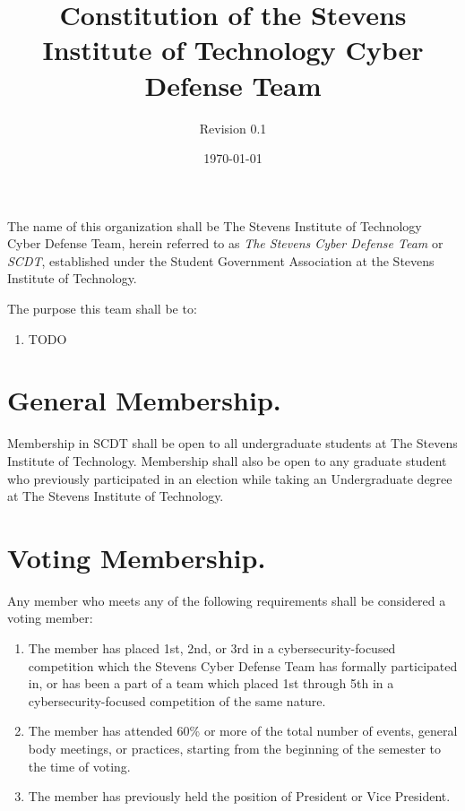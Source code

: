 \documentclass[12pt]{constitution}
\begin{document}
\title{Constitution of the Stevens Institute of Technology Cyber Defense Team}
\author{Revision 0.1} 
\date{\today}
\maketitle

\setcounter{tocdepth}{0}
\tableofcontents

\newpage

\label{art:NAME}

The name of this organization shall be The Stevens Institute of Technology Cyber
Defense Team, herein referred to as \textit{The Stevens Cyber Defense Team} or
\textit{SCDT}, established under the Student Government Association at the
Stevens Institute of Technology.

\label{art:GOALS}

The purpose this team shall be to:

\begin{enumerate}
    \item TODO
\end{enumerate}

\label{art:MEMBERSHIP}

\section{General Membership.}\label{sec:GENERAL-MEMBERSHIP}

Membership in SCDT shall be open to all undergraduate students at The Stevens
Institute of Technology. Membership shall also be open to any graduate student
who previously participated in an election while taking an Undergraduate degree
at The Stevens Institute of Technology.

\section{Voting Membership.}\label{sec:VOTING-MEMBERSHIP}


Any member who meets any of the following requirements shall be considered a
voting member:

\begin{enumerate}
    \item The member has placed 1st, 2nd, or 3rd in a cybersecurity-focused
    competition which the Stevens Cyber Defense Team has formally participated
    in, or has been a part of a team which placed 1st through 5th in a
    cybersecurity-focused competition of the same nature.
    \item The member has attended 60\% or more of the total number of events,
    general body meetings, or practices, starting from the beginning of the
    semester to the time of voting.
    \item The member has previously held the position of President or Vice
    President.
\end{enumerate}
\end{document}

